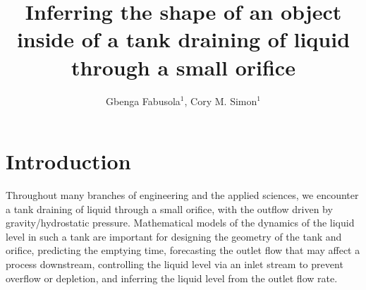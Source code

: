 \documentclass[openacc]{rsproca_new}%
\begin{document}
\title{Inferring the shape of an object inside of a tank draining of liquid through a small orifice}

\author{%
Gbenga Fabusola$^{1}$, 
Cory M. Simon$^{1}$
}

\address{$^{1}$School of Chemical, Biological, and Environmental Engineering. Oregon State University. Corvallis, OR, USA.
}

\subject{applied mathematics, chemical engineering}



\begin{abstract}

\absbreak %
\end{abstract}

\rsbreak


\section{Introduction}
Throughout many branches of engineering and the applied sciences, we encounter a tank draining of liquid through a small orifice, with the outflow driven by gravity/hydrostatic pressure.
Mathematical models of the dynamics of the liquid level in such a tank are important for designing the geometry of the tank and orifice, predicting the emptying time, forecasting the outlet flow that may affect a process downstream, controlling the liquid level via an inlet stream to prevent overflow or depletion, and inferring the liquid level from the outlet flow rate.
\end{document}
